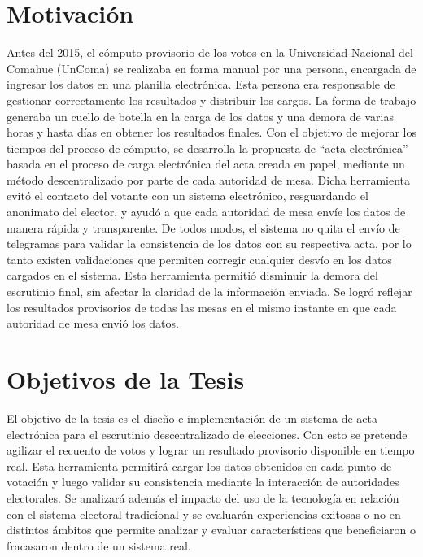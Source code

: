 \section{Motivación}
Antes del 2015, el cómputo provisorio de los votos en la Universidad Nacional del Comahue (UnComa) se realizaba en forma manual por una persona, encargada de ingresar los datos en una planilla electrónica. Esta persona era responsable de gestionar correctamente los resultados y distribuir los cargos. La forma de trabajo generaba un cuello de botella en la carga de los datos y una demora de varias horas y hasta días en obtener los resultados finales. \newline
Con el objetivo de mejorar los tiempos del proceso de cómputo, se desarrolla la propuesta de ``acta electrónica'' basada en el proceso de carga electrónica del acta creada en papel, mediante un método descentralizado  por parte de cada autoridad de mesa. Dicha herramienta evitó el contacto del votante con un sistema electrónico, resguardando el anonimato del elector, y ayudó a que cada autoridad de mesa envíe los datos de manera rápida y transparente. De todos modos, el sistema no quita el envío de telegramas para validar la consistencia de los datos con su respectiva acta, por lo tanto existen validaciones que permiten corregir cualquier desvío en los datos cargados en el sistema. Esta herramienta permitió disminuir la demora del escrutinio final, sin afectar la claridad de la información enviada. Se logró reflejar los resultados provisorios de todas las mesas 
en el mismo instante en que cada autoridad de mesa envió los datos.

\section{Objetivos de la Tesis}
El objetivo de la tesis es el diseño e implementación de un sistema de acta electrónica para el escrutinio descentralizado de elecciones. Con esto se pretende agilizar el recuento de votos y lograr un resultado provisorio disponible en tiempo real. Esta herramienta permitirá cargar los datos obtenidos en cada punto de votación y luego validar su consistencia mediante la interacción de autoridades electorales. \newline
Se analizará además el impacto del uso de la tecnología en relación con el sistema electoral tradicional y
se evaluarán experiencias exitosas o no en distintos ámbitos que permite analizar y evaluar características que beneficiaron o fracasaron dentro de un sistema real.\newline


